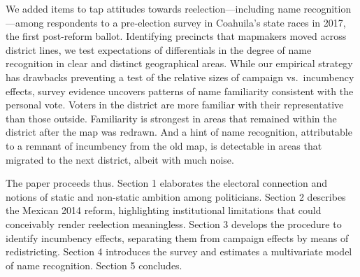 \documentclass[letter,12pt]{article}
\begin{document}
We added items to tap attitudes towards reelection---including name recognition---among respondents to a pre-election survey in Coahuila's state races in 2017, the first post-reform ballot. Identifying precincts that mapmakers moved across district lines, we test expectations of differentials in the degree of name recognition in clear and distinct geographical areas. While our empirical strategy has drawbacks preventing a test of the relative sizes of campaign vs.\ incumbency effects, survey evidence uncovers patterns of name familiarity consistent with the personal vote. Voters in the district are more familiar with their representative than those outside. Familiarity is strongest in areas that remained within the district after the map was redrawn. And a hint of name recognition, attributable to a remnant of incumbency from the old map, is detectable in areas that migrated to the next district, albeit with much noise.

The paper proceeds thus. Section 1 elaborates the electoral connection and notions of static and non-static ambition among politicians. Section 2 describes the Mexican 2014 reform, highlighting institutional limitations that could conceivably render reelection meaningless. Section 3 develops the procedure to identify incumbency effects, separating them from campaign effects by means of redistricting. Section 4 introduces the survey and estimates a multivariate model of name recognition. Section 5 concludes.  


\end{document}
